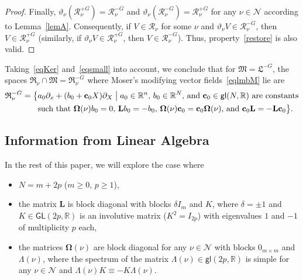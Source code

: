 \documentclass[12pt,reqno]{amsart}
\theoremstyle{definition}
\begin{document}
\begin{proof}
Finally, ${\vartheta}_\nu({\mathcal R}_\nu^{+G})={\mathcal R}_\nu^{-G}$ and
${\vartheta}_\nu({\mathcal R}_\nu^{-G})={\mathcal R}_\nu^{+G}$ for any $\nu\in{\mathcal N}$ according to
Lemma~\ref{lemA}. Consequently, if $V\in{\mathcal R}_\nu$ for some $\nu$ and
${\vartheta}_\nu V\in{\mathcal R}_\nu^{-G}$, then $V\in{\mathcal R}_\nu^{+G}$ (similarly, if
${\vartheta}_\nu V\in{\mathcal R}_\nu^{+G}$, then $V\in{\mathcal R}_\nu^{-G}$). Thus,
property~\ref{restore} is also valid.
\end{proof}

Taking~\eqref{eqKer} and~\eqref{eqsmall} into account, we conclude that for
${\mathfrak M}={\mathfrak L}^{-G}$, the spaces ${\mathfrak R}_\nu\cap{\mathfrak M}={\mathfrak R}_\nu^{-G}$ where Moser's
modifying vector fields~\eqref{eqlmbM} lie are
\begin{equation}
\begin{aligned}
{\mathfrak R}_\nu^{-G}=\bigl\{ & a_0\partial_x+(b_0+{\mathbf c}_0X)\partial_X \bigm| {}
\text{$a_0\in{\mathbb R}^n$, $b_0\in{\mathbb R}^N$, and ${\mathbf c}_0\in{\mathsf{gl}}(N,{\mathbb R})$ are constants} \\
& \text{such that ${\mathbf{\Omega}}(\nu)b_0=0$, ${\mathbf L} b_0=-b_0$,
${\mathbf{\Omega}}(\nu){\mathbf c}_0={\mathbf c}_0{\mathbf{\Omega}}(\nu)$, and ${\mathbf c}_0{\mathbf L}=-{\mathbf L}{\mathbf c}_0$} \bigr\}.
\end{aligned}
\label{eqkernel}
\end{equation}

\subsection{Information from Linear Algebra}\label{linalg}

In the rest of this paper, we will explore the case where
\begin{itemize}
\item $N=m+2p$ ($m{\geqslant} 0$, $p{\geqslant} 1$),
\item the matrix ${\mathbf L}$ is block diagonal with blocks $\delta I_m$ and $K$,
where $\delta=\pm 1$ and $K\in{\mathsf{GL}}(2p,{\mathbb R})$ is an involutive matrix
($K^2=I_{2p}$) with eigenvalues $1$ and $-1$ of multiplicity $p$ each,
\item the matrices ${\mathbf{\Omega}}(\nu)$ are block diagonal for any $\nu\in{\mathcal N}$ with
blocks $0_{m\times m}$ and $\Lambda(\nu)$, where the spectrum of the matrix
$\Lambda(\nu)\in{\mathsf{gl}}(2p,{\mathbb R})$ is simple for any $\nu\in{\mathcal N}$ and
$\Lambda(\nu)K\equiv-K\Lambda(\nu)$.
\end{itemize}
\end{document}
